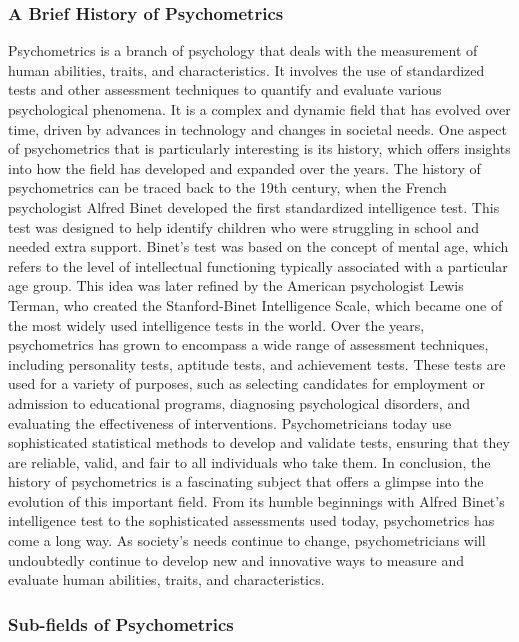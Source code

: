 \documentclass[
]{article}
\begin{document}
\hypertarget{a-brief-history-of-psychometrics}{%
\subsubsection{A Brief History of
Psychometrics}\label{a-brief-history-of-psychometrics}}

Psychometrics is a branch of psychology that deals with the measurement
of human abilities, traits, and characteristics. It involves the use of
standardized tests and other assessment techniques to quantify and
evaluate various psychological phenomena. It is a complex and dynamic
field that has evolved over time, driven by advances in technology and
changes in societal needs. One aspect of psychometrics that is
particularly interesting is its history, which offers insights into how
the field has developed and expanded over the years. The history of
psychometrics can be traced back to the 19th century, when the French
psychologist Alfred Binet developed the first standardized intelligence
test. This test was designed to help identify children who were
struggling in school and needed extra support. Binet’s test was based on
the concept of mental age, which refers to the level of intellectual
functioning typically associated with a particular age group. This idea
was later refined by the American psychologist Lewis Terman, who created
the Stanford-Binet Intelligence Scale, which became one of the most
widely used intelligence tests in the world. Over the years,
psychometrics has grown to encompass a wide range of assessment
techniques, including personality tests, aptitude tests, and achievement
tests. These tests are used for a variety of purposes, such as selecting
candidates for employment or admission to educational programs,
diagnosing psychological disorders, and evaluating the effectiveness of
interventions. Psychometricians today use sophisticated statistical
methods to develop and validate tests, ensuring that they are reliable,
valid, and fair to all individuals who take them. In conclusion, the
history of psychometrics is a fascinating subject that offers a glimpse
into the evolution of this important field. From its humble beginnings
with Alfred Binet’s intelligence test to the sophisticated assessments
used today, psychometrics has come a long way. As society’s needs
continue to change, psychometricians will undoubtedly continue to
develop new and innovative ways to measure and evaluate human abilities,
traits, and characteristics.

\hypertarget{sub-fields-of-psychometrics}{%
\subsubsection{Sub-fields of
Psychometrics}\label{sub-fields-of-psychometrics}}
\end{document}

